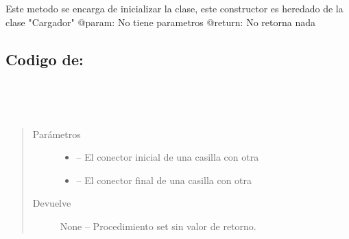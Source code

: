 \documentclass[letterpaper,10pt,english]{sphinxmanual}
\begin{document}

\begin{fulllineitems}
\label{\detokenize{codigo:cargador.CargadorTXT}}
Este metodo se encarga de inicializar la clase, este constructor es heredado de la clase "Cargador"
@param: No tiene parametros
@return: No retorna nada

\end{fulllineitems}



\subsection{Codigo de: }
\label{\detokenize{codigo:module-conector}}\label{\detokenize{codigo:codigo-de-conector}}

\begin{fulllineitems}
\label{\detokenize{codigo:conector.Conector}}~

\begin{fulllineitems}
\label{\detokenize{codigo:conector.Conector.setCasillas}}~\begin{quote}\begin{description}
\item[{Parámetros}] \leavevmode\begin{itemize}
\item {} 
 -- El conector inicial de una casilla con otra

\item {} 
 -- El conector final de una casilla con otra

\end{itemize}

\item[{Devuelve}] \leavevmode
None -- Procedimiento set sin valor de retorno.

\end{description}\end{quote}

\end{fulllineitems}


\end{fulllineitems}
\end{document}

